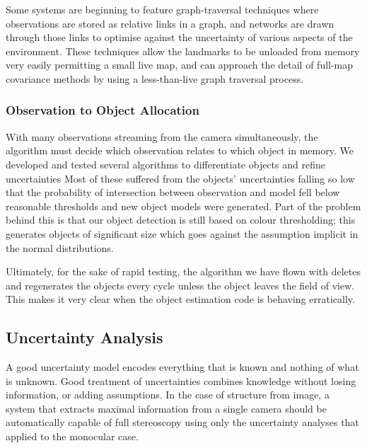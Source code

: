 \documentclass[a4paper, 11pt, titlepage]{article}
\begin{document}
      Some systems are beginning to feature graph-traversal techniques where observations are stored as relative links in a graph, and networks are drawn through those links to optimise against the uncertainty of various aspects of the environment.  These techniques allow the landmarks to be unloaded from memory very easily permitting a small live map, and can approach the detail of full-map covariance methods by using a less-than-live graph traversal process.


    \subsubsection{Observation to Object Allocation}
      \label{sec:objectAllocation}
      With many observations streaming from the camera simultaneously, the algorithm must decide which observation relates to which object in memory.  We developed and tested several algorithms to differentiate objects and refine uncertainties
      Most of these suffered from the objects' uncertainties falling so low that the probability of intersection between observation and model fell below reasonable thresholds and new object models were generated.  Part of the problem behind this is that our object detection is still based on colour thresholding; this generates objects of significant size which goes against the assumption implicit in the normal distributions.

      Ultimately, for the sake of rapid testing, the algorithm we have flown with deletes and regenerates the objects every cycle unless the object leaves the field of view.  This makes it very clear when the object estimation code is behaving erratically.

  \subsection{Uncertainty Analysis}
    \label{sec:UncertaintyAnalysis}

    A good uncertainty model encodes everything that is known and nothing of what is unknown.  Good treatment of uncertainties combines knowledge without losing information, or adding assumptions.
    In the case of structure from image, a system that extracts maximal information from a single camera should be automatically capable of full stereoscopy using only the uncertainty analyses that applied to the monocular case.
    
\end{document}
